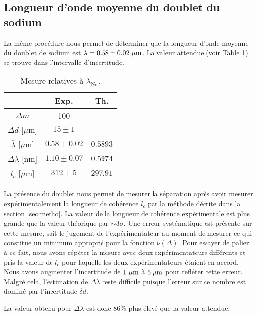 \documentclass[10pt,letterpaper,twocolumn]{article}
\newcommand{\s}{\hspace{0.1cm}}
\begin{document}
\subsection{Longueur d'onde moyenne du doublet du sodium}
La même procédure nous permet de déterminer que la longueur d'onde moyenne du doublet de sodium est ${\bar{\lambda} = 0.58 \pm 0.02 \s \mu\text{m}}$. La valeur attendue (voir Table \ref{tab:Na}) se trouve dans l'intervalle d'incertitude.
\begin{table}[H]
	\centering
	\caption{Mesure relatives à $\bar{\lambda}_{\text{Na}} $. }
	\label{tab:Na}
	\begin{tabular}{|c|c|c|}
	  \hline
	      & Exp. & Th. \\\hline
		$\Delta m$ & 100 & - \\\hline
		$\Delta d$ [$\mu$m] & $15\pm1$ & -  \\\hline
		$\bar{\lambda}$ [$\mu$m]   &  $0.58 \pm 0.02$ & $0.5893$ \\\hline
		$\Delta \lambda$ [nm] & $1.10 \pm 0.07$ & $0.5974$ \\\hline
		$l_c$ [$\mu$m]   & $312 \pm 5$ & $297.91$ \\\hline
	\end{tabular}
\end{table}
La présence du doublet nous permet de mesurer la séparation après avoir mesurer expérimentalement la longueur de cohérence $l_c$ par la méthode décrite dans la section \ref{sec:metho}. 
La valeur de la longueur de cohérence expérimentale est plus grande que la valeur théorique par $\sim 3\sigma$. Une erreur systématique est présente sur cette mesure, soit le jugement de l'expérimentateur au moment de mesurer ce qui constitue un minimum approprié pour la fonction $\nu(\Delta)$. Pour essayer de palier à ce fait, nous avons répéter la mesure avec deux expérimentateurs différents et pris la valeur de $l_c$ pour laquelle les deux expérimentateurs étaient en accord. Nous avons augmenter l'incertitude de $1\s \mu\text{m}$ à $5\s \mu\text{m}$ pour refléter cette erreur. Malgré cela, l'estimation de $\Delta \lambda$ reste difficile puisque l'erreur sur ce nombre est dominé par l'incertitude $\delta d$.\par
La valeur obtenu pour $\Delta \lambda$ est donc $86\% $ plus élevé que la valeur attendue. 
\end{document}
